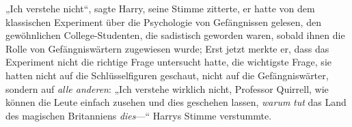 „Ich verstehe nicht“, sagte Harry, seine Stimme zitterte, er hatte von dem klassischen Experiment über die Psychologie von Gefängnissen gelesen, den gewöhnlichen College-Studenten, die sadistisch geworden waren, sobald ihnen die Rolle von Gefängniswärtern zugewiesen wurde; Erst jetzt merkte er, dass das Experiment nicht die richtige Frage untersucht hatte, die wichtigste Frage, sie hatten nicht auf die Schlüsselfiguren geschaut, nicht auf die Gefängniswärter, sondern auf \emph{alle anderen}: „Ich verstehe wirklich nicht, Professor Quirrell, wie können die Leute einfach zusehen und dies geschehen lassen, \emph{warum} \emph{tut} das Land des magischen Britanniens \emph{dies}—“ Harrys Stimme verstummte.


